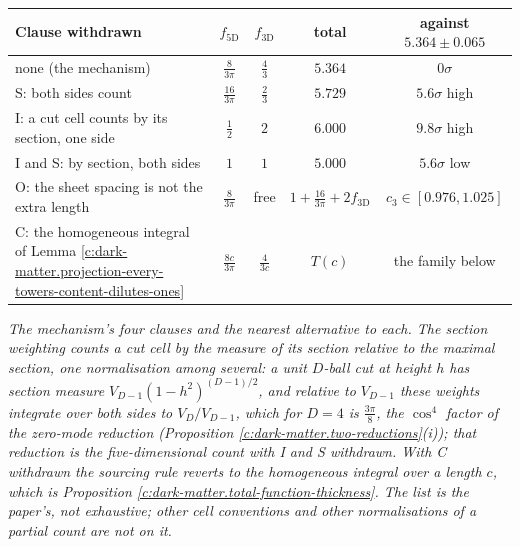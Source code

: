 \documentclass[11pt]{article}
\theoremstyle{definition}
\theoremstyle{plain}
\begin{document}
\label{c:note.dark-matter.setting-thickness-contact-mechanism-2}
\centering \begin{tabular}{lcccc}
\toprule
Clause withdrawn & $f_{5\mathrm{D}}$ & $f_{3\mathrm{D}}$ & total & against $5.364 \pm 0.065$ \\
\midrule
none (the mechanism) & $\tfrac{8}{3\pi}$ & $\tfrac{4}{3}$ & $5.364$ & $0\sigma$ \\[2pt]
S: both sides count & $\tfrac{16}{3\pi}$ & $\tfrac{2}{3}$ & $5.729$ & $5.6\sigma$ high \\[2pt]
I: a cut cell counts by its section, one side & $\tfrac{1}{2}$ & $2$ & $6.000$ & $9.8\sigma$ high \\[2pt]
I and S: by section, both sides & $1$ & $1$ & $5.000$ & $5.6\sigma$ low \\[2pt]
O: the sheet spacing is not the extra length & $\tfrac{8}{3\pi}$ & free & $1 + \tfrac{16}{3\pi} + 2f_{3\mathrm{D}}$ & $c_{3} \in [0.976, 1.025]$ \\[2pt]
C: the homogeneous integral of Lemma \ref{c:dark-matter.projection-every-towers-content-dilutes-ones} & $\tfrac{8c}{3\pi}$ & $\tfrac{4}{3c}$ & $T(c)$ & the family below \\
\bottomrule
\end{tabular}

\emph{The mechanism's four clauses and the nearest alternative to each. The section weighting counts a cut cell by the measure of its section relative to the maximal section, one normalisation among several: a unit $D$-ball cut at height $h$ has section measure $V_{D-1}(1 - h^{2})^{(D-1)/2}$, and relative to $V_{D-1}$ these weights integrate over both sides to $V_{D}/V_{D-1}$, which for $D = 4$ is $\tfrac{3\pi}{8}$, the $\cos^{4}$ factor of the zero-mode reduction (Proposition \ref{c:dark-matter.two-reductions}(i)); that reduction is the five-dimensional count with I and S withdrawn. With C withdrawn the sourcing rule reverts to the homogeneous integral over a length $c$, which is Proposition \ref{c:dark-matter.total-function-thickness}. The list is the paper's, not exhaustive; other cell conventions and other normalisations of a partial count are not on it.}
\end{document}

